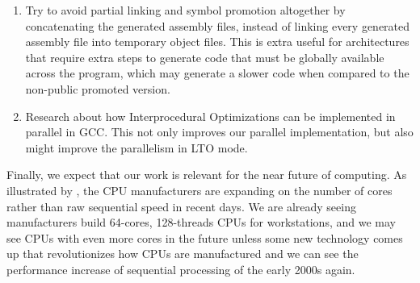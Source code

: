 \begin{enumerate}
\item Try to avoid partial linking and symbol promotion altogether by
concatenating the generated assembly files, instead of linking every generated
assembly file into temporary object files. This is extra useful for
architectures that require extra steps to generate code that must be globally
available across the program, which may generate a slower code when compared to
the non-public promoted version.

\item Research about how Interprocedural Optimizations can be implemented
in parallel in GCC. This not only improves our parallel implementation,
but also might improve the parallelism in LTO mode.

\end{enumerate}

Finally, we expect that our work is relevant for the near future of computing.
As illustrated by \cite{42years}, the CPU manufacturers are expanding on the
number of cores rather than raw sequential speed in recent days. We are already
seeing manufacturers build 64-cores, 128-threads CPUs for workstations, and we
may see CPUs with even more cores in the future unless some new technology
comes up that revolutionizes how CPUs are manufactured and we can see the
performance increase of sequential processing of the early 2000s again.

